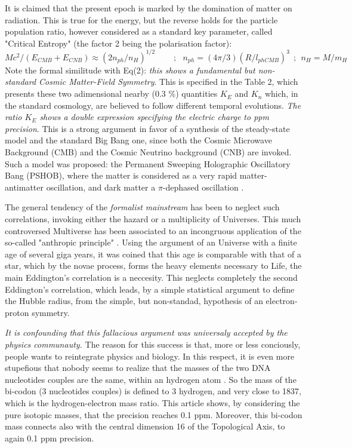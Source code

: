 \documentclass[a4paper,9pt]{article}
\newcounter{row}
\begin{document}
It is claimed that the present epoch is marked by the domination of matter on radiation. This is true for the energy, but the reverse holds for the particle population ratio, however considered as a standard key parameter, called "Critical Entropy" (the factor 2 being the polarisation factor):
\begin{equation}
Mc^2 /(E_{CMB} + E_{CNB}) \approx (2n_{ph}/n_H)^{1/2}~~~~~~~~~~; ~~~ n_{ph} = (4\pi/3)(R/l_{phCMB})^3    ~~;~~ n_ H= M/m_H
 \end{equation}
Note the formal similitude with Eq(2): \textit {this shows a fundamental but non-standard Cosmic Matter-Field Symmetry}. This is specified in the Table 2, which presents these two adimensional nearby (0.3 \%) quantities $K_E$ and $K_n$ which, in the standard cosmology, are believed to follow different temporal evolutions. \textit {The ratio $K_E$ shows a double expression specifying the electric charge to ppm precision}. This is a strong argument in favor of a synthesis of the steady-state model and the standard Big Bang one, since both the Cosmic Microwave Background (CMB) and the Cosmic Neutrino background (CNB) are invoked. Such a model was proposed: the Permanent Sweeping Holographic Oscillatory Bang (PSHOB), where the matter is considered as a very rapid matter-antimatter oscillation, and dark matter a $\pi$-dephased oscillation \cite{Sanchez5} \cite{Sanchez4}.

The general tendency of the \textit {formalist mainstream} has been to neglect such correlations, invoking either the hazard or a multiplicity of Universes. This much controversed Multiverse has been associated to an incongruous application of the so-called "anthropic principle" \cite{Rees}. Using the argument of an Universe with a finite age of several giga years, it was coined \cite{Dicke} that this age is comparable with that of a star, which by the novae process, forms the heavy elements necessary to Life, the main Eddington's correlation is a neccesity. This neglects completely the second Eddington's correlation, which leads, by a simple statistical argument to define the Hubble radius, from the simple, but non-standad, hypothesis of an electron-proton symmetry.

\textit {It is confounding that this fallacious argument was universaly accepted by the physics communauty.} The reason for this success is that, more or less conciously, people wants to reintegrate physics and biology. In this respect, it is even more stupefious that nobody seems to realize that the masses of the two DNA nucleotides couples are the same, within an hydrogen atom \cite{Sanchez5}. So the mass of the bi-codon (3 nucleotides couples) is defined to 3 hydrogen, and very close to 1837, which is the hydrogen-electron mass ratio. This article shows, by considering the pure isotopic masses, that the precision reaches 0.1 ppm. Moreover, this bi-codon mass connects also with the central dimension 16 of the Topological Axis, to again 0.1 ppm precision.    
\end{document}
